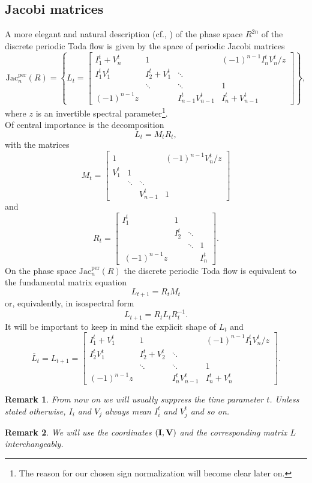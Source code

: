 \documentclass[11pt, a4paper]{amsart}
\newcommand{\eq}[1]{\begin{equation}#1 \end{equation}}
\newcommand{\eqst}[1]{\begin{equation*}#1\end{equation*}}
\theoremstyle{plain}
\newtheorem{remark}{Remark}[section]
\numberwithin{equation}{section}
\begin{document}
\subsection{Jacobi matrices}
\label{sec-jacobi}
A more elegant and natural description (cf., \cite{spectrumjacobi,tokihiro1,iwao}) of the phase space $R^{2n}$ of the discrete periodic Toda flow is given by the space of periodic Jacobi matrices \eqst{\mathrm{Jac}_n^{\mathrm{per}}(R) = \left\{L_t=\begin{bmatrix}I_1^t + V_n^t  & 1&  & (-1)^{n-1} I_n^t V_n^t / z \\ I_1^t V_1^t& I_2^t + V_1^t & \ddots & \\ & \ddots & \ddots & 1 \\ (-1)^{n-1}z & &I_{n-1}^t V_{n-1}^t &I_n^t+V_{n-1}^t \end{bmatrix}\right\},} where $z$ is an invertible spectral parameter\footnote{The reason for our chosen sign normalization will become clear later on.}. \\
Of central importance is the decomposition \eqst{L_t = M_tR_t,}
with the matrices \eqst{M_t = \begin{bmatrix} 1 &  & & (-1)^{n-1} V_n^t / z \\ V_1^t & 1 & & \\ & \ddots & \ddots & \\ & & V_{n-1}^t & 1 \end{bmatrix}} and \eqst{R_t = \begin{bmatrix} I_1^t & 1 & & \\ & I_2^t & \ddots & \\ & & \ddots & 1 \\\ (-1)^{n-1}z & & & I_n^t \end{bmatrix}.} On the phase space $\mathrm{Jac}_n^{\mathrm{per}}(R)$ the discrete periodic Toda flow is equivalent to the fundamental matrix equation \eqst{ L_{t+1} = R_t M_t} or, equivalently, in isospectral form \eq{\label{isospec} {L}_{t+1}  = R_t L_t R_t^{-1}.}
It will be important to keep in mind the explicit shape of $L_t$ %
and \eqst{\overline L _{t} = {L}_{t+1} = \begin{bmatrix} I_1^t + V_1^t  & 1&  & (-1)^{n-1}I_1^t V_n^t / z \\ I_2^t V_1^t& I_2^t + V_2^t & \ddots & \\ & \ddots & \ddots & 1 \\ (-1)^{n-1}z & &I_{n}^t V_{n-1}^t &I_n^t+V_{n}^t \end{bmatrix}.} 

\begin{remark}
From now on we will usually suppress the time parameter $t$. Unless stated otherwise, $I_i$ and $V_j$ always mean $I_i^t$ and $V_j^t$ and so on.
\end{remark}
\begin{remark}
We will use the coordinates $(\bold{I},\bold{V})$ and the corresponding matrix $L$ interchangeably. 
\end{remark}
\end{document}
